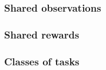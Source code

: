 \documentclass[11pt]{article}
\begin{document}
\subsubsection{Shared observations}

\subsubsection{Shared rewards}

\subsubsection{Classes of tasks}






\renewcommand{\refname}{Bibliography \& References Cited}

\end{document}
